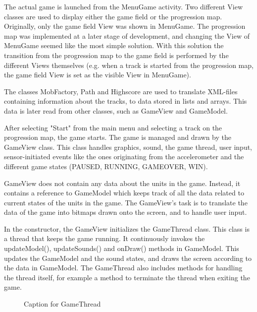 The actual game is launched from the MenuGame activity. Two different View classes are used to display either the game field or the progression map. Originally, only the game field View was shown in MenuGame. The progression map was implemented at a later stage of development, and changing the View of MenuGame seemed like the most simple solution. With this solution the transition from the progression map to the game field is performed by the different Views themselves (e.g. when a track is started from the progression map, the game field View is set as the visible View in MenuGame).

The classes MobFactory, Path and Highscore are used to translate XML-files containing information about the tracks, to data stored in lists and arrays. This data is later read from other classes, such as GameView and GameModel.
 
After selecting "Start" from the main menu and selecting a track on the progression map, the game starts. The game is managed and drawn by the GameView class. This class handles graphics, sound, the game thread, user input, sensor-initiated events like the ones originating from the accelerometer and the different game states (PAUSED, RUNNING, GAMEOVER, WIN).

GameView does not contain any data about the units in the game. Instead, it contains a reference to GameModel which keeps track of all the data related to current states of the units in the game. The GameView's task is to translate the data of the game into bitmaps drawn onto the screen, and to handle user input. 

In the constructor, the GameView initializes the GameThread class. This class is a thread that keeps the game running. It continuously invokes the updateModel(), updateSounds() and onDraw() methods in GameModel. This updates the GameModel and the sound states, and draws the screen according to the data in GameModel. The GameThread also includes methods for handling the thread itself, for example a method to terminate the thread when exiting the game.

\begin{figure}[htb]

\begin{small}

\end{small}

\caption{Caption for GameThread}
\label{fig:codeExGameThread}
\end{figure}

